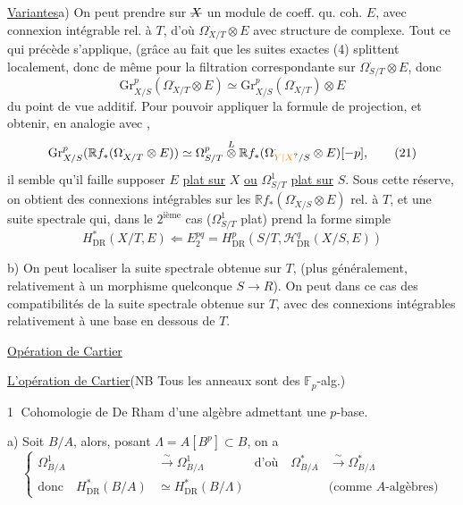 \uline{Variantes}\qquad a) On peut prendre sur $\deleted{X}$ un module de coeff. qu. coh. $E$, avec connexion intégrable rel. à $T$, d'où $\Omega^\cdot_{X/T}\otimes E$ avec structure de complexe. Tout ce qui précède s'applique, (grâce au fait que les suites exactes (4) splittent localement, donc  de même pour la filtration correspondante sur $\Omega^\cdot_{S/T}\otimes E$, donc
\[
 \mathrm{Gr}_{X/S}^{p}(\Omega^\cdot_{X/T}\otimes E)
 \simeq\mathrm{Gr}_{X/S}^{p}(\Omega^\cdot_{X/T})\otimes E
\]
du point de vue additif. Pour pouvoir appliquer la formule de projection, et obtenir, en analogie avec  ,
\[
 \mathrm{Gr}_{X/S}^{p}(\mathbb R f_*(\Omega^\cdot_{X/T}\otimes E))
 \simeq\Omega^p_{S/T}\overset{L}{\otimes}\mathbb R f_*(\Omega^\cdot_{\unsure{Y|X}/S}\otimes E)[-p],
 \tag*{(21)}
\]
il semble qu'il faille supposer $E$ \uline{plat sur} $X$ \uline{ou} $\Omega^1_{S/T}$ \uline{plat sur} $S$. Sous cette réserve, on obtient des  connexions intégrables sur les $\mathbb R f_*(\Omega^\cdot_{X/S}\otimes E)$ rel. à $T$, et une suite spectrale qui, dans le $2^{\text{ième}}$ cas ($\Omega^1_{S/T}$ plat) prend la forme simple
\[
 H^*_{\mathrm{DR}}(X/T,E)\Longleftarrow E_2^{pq}=H^p_{\mathrm{DR}}(S/T,\mathscr H^q_{\mathrm{DR}}(X/S,E))
 \tag*{(22)}
\]

b) On peut localiser la suite spectrale obtenue sur $T$, (plus généralement, relativement à un morphisme quelconque $S\longrightarrow R$). On peut dans ce cas  des compatibilités de la suite spectrale obtenue sur $T$, avec des connexions intégrables relativement à une base en dessous de $T$.

\begin{flushright}
\uline{Opération de Cartier}
\end{flushright}

\uline{L'opération de Cartier}\qquad (NB Tous les anneaux sont des $\mathbb F_p$-alg.)

\textcircled{1} Cohomologie de De Rham d'une algèbre admettant une $p$-base.

a) Soit $B/A$, alors, posant $\Lambda=A[B^p]\subset B$, on a
\[
 \left\{\begin{aligned}
 \Omega^1_{B/A}&\xrightarrow{\sim}\Omega^1_{B/\Lambda}
 &\text{d'où}\quad\Omega^*_{B/A}&\xrightarrow{\sim}\Omega^*_{B/\Lambda}\\
 \text{donc}\quad H^*_{\mathrm{DR}}(B/A)&\simeq H^*_{\mathrm{DR}}(B/\Lambda)
 &&\text{(comme $A$-algèbres)}
 \end{aligned}\right.
\]

